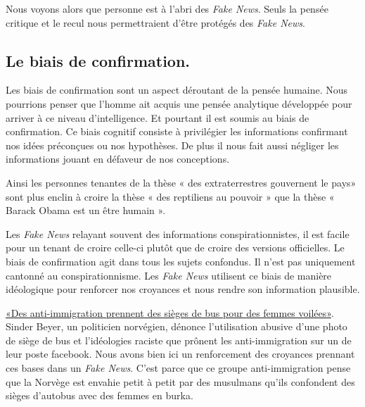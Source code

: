 \documentclass[11pt,a4paper,oldfontcommands]{memoir}
\begin{document}
Nous voyons alors que personne est à l'abri des \textit{Fake News}. Seuls la pensée critique et le recul nous permettraient d'être protégés des \textit{Fake News}.


\subsection{Le biais de confirmation.}
Les biais de confirmation sont un aspect déroutant de la pensée humaine.
Nous pourrions penser que l'homme ait acquis une pensée analytique développée pour arriver à ce niveau d'intelligence.
Et pourtant il est soumis au biais de confirmation.
Ce biais cognitif consiste à privilégier les informations confirmant nos idées préconçues ou nos hypothèses.
De plus il nous fait aussi négliger les informations jouant en défaveur de nos conceptions.

Ainsi les personnes tenantes de la thèse « des extraterrestres gouvernent le pays» sont plus enclin à croire la thèse « des reptiliens au pouvoir » que la thèse « Barack Obama est un être humain ».

Les \textit{Fake News} relayant souvent des informations conspirationnistes, il est facile pour un tenant de croire celle-ci plutôt que de croire des versions officielles.
Le biais de confirmation agit dans tous les sujets confondus.
Il n'est pas uniquement cantonné au conspirationnisme.
Les \textit{Fake News} utilisent ce biais de manière idéologique pour renforcer nos croyances et nous rendre son information plausible.

\href{http://www.rtl.fr/actu/debats-societe/des-anti-immigration-prennent-des-sieges-de-bus-pour-des-femmes-voilees-7789583989}{«Des anti-immigration prennent des sièges de bus pour des femmes voilées»}.
Sinder Beyer, un politicien norvégien, dénonce l'utilisation abusive d'une photo de siège de bus et l'idéologies raciste que prônent les anti-immigration sur un de leur poste facebook. Nous avons bien ici un renforcement des croyances prennant ces bases dans un \textit{Fake News}. C'est parce que ce groupe anti-immigration pense que la Norvège est envahie petit à petit par des musulmans qu'ils confondent des sièges d'autobus avec des femmes en burka.
\end{document}

